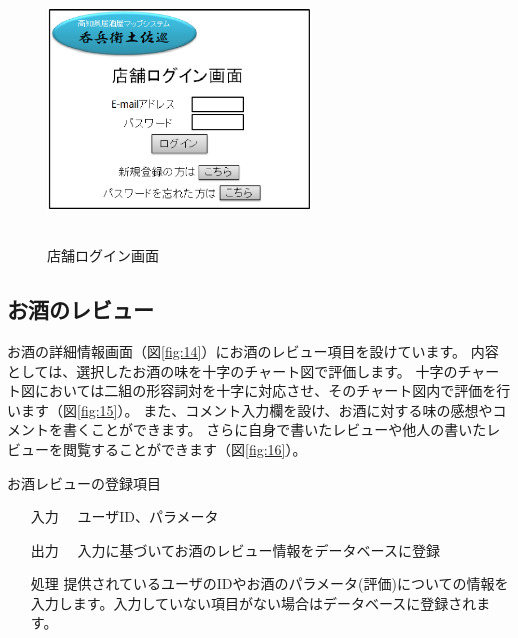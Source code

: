 \documentclass[a4j,titlepage]{jarticle}
\begin{document}
\begin{figure}[htbp]
  \begin{center}
  \includegraphics [height=7cm, width=7cm]{extrnal1_design_document_image/s5.eps}
  \caption{店舗ログイン画面}
  \label {fig:s5}
  \end{center}
\end{figure}

\newpage
\subsection{お酒のレビュー}
お酒の詳細情報画面（図\ref{fig:14}）にお酒のレビュー項目を設けています。
内容としては、選択したお酒の味を十字のチャート図で評価します。
十字のチャート図においては二組の形容詞対を十字に対応させ、そのチャート図内で評価を行います（図\ref{fig:15}）。
また、コメント入力欄を設け、お酒に対する味の感想やコメントを書くことができます。
さらに自身で書いたレビューや他人の書いたレビューを閲覧することができます（図\ref{fig:16}）。

お酒レビューの登録項目
\begin{enumerate}
  \item [入力]　ユーザID、パラメータ
  \item [出力]　入力に基づいてお酒のレビュー情報をデータベースに登録
  \item [処理]  提供されているユーザのIDやお酒のパラメータ(評価)についての情報を入力します。入力していない項目がない場合はデータベースに登録されます。
\end{enumerate}
\end{document}
